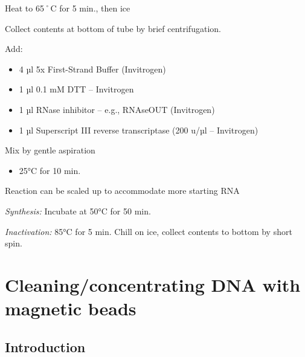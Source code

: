 \documentclass[
  letterpaper,
  DIV=11,
  numbers=noendperiod]{scrreprt}
\providecommand{\tightlist}{%
  \setlength{\itemsep}{0pt}\setlength{\parskip}{0pt}}\usepackage{longtable,booktabs,array}
\begin{document}
Heat to 65˚C for 5 min., then ice

Collect contents at bottom of tube by brief centrifugation.

Add:

\begin{itemize}
\tightlist
\item
  4 µl 5x First-Strand Buffer (Invitrogen)
\item
  1 µl 0.1 mM DTT -- Invitrogen
\item
  1 µl RNase inhibitor -- e.g., RNAseOUT (Invitrogen)
\item
  1 µl Superscript III reverse transcriptase (200 u/µl -- Invitrogen)
\end{itemize}

Mix by gentle aspiration

\begin{itemize}
\tightlist
\item
  25°C for 10 min.
\end{itemize}

\begin{tcolorbox}[enhanced jigsaw, toprule=.15mm, breakable, coltitle=black, leftrule=.75mm, title=\textcolor{quarto-callout-warning-color}{\faExclamationTriangle}\hspace{0.5em}{NOTES}, bottomrule=.15mm, toptitle=1mm, bottomtitle=1mm, colframe=quarto-callout-warning-color-frame, opacityback=0, colback=white, opacitybacktitle=0.6, colbacktitle=quarto-callout-warning-color!10!white, rightrule=.15mm, titlerule=0mm, arc=.35mm, left=2mm]

Reaction can be scaled up to accommodate more starting RNA

\end{tcolorbox}

\emph{Synthesis:} Incubate at 50°C for 50 min.

\emph{Inactivation:} 85°C for 5 min. Chill on ice, collect contents to
bottom by short spin.

\hypertarget{sec-molecular-bead_extraction_dup}{%
\chapter{Cleaning/concentrating DNA with magnetic
beads}\label{sec-molecular-bead_extraction_dup}}

\hypertarget{introduction-19}{%
\section{Introduction}\label{introduction-19}}
\end{document}

